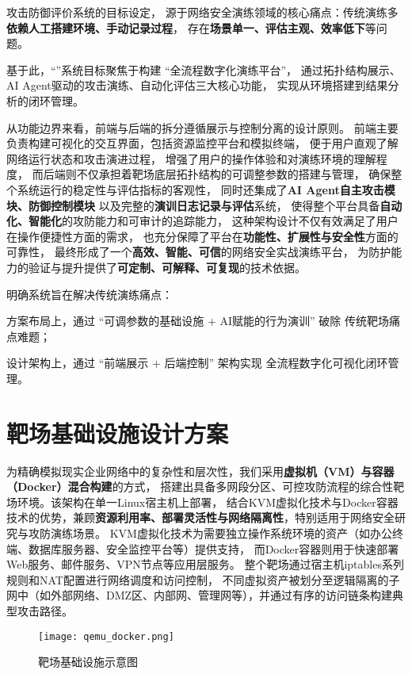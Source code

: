 \documentclass[lang=cn,10pt]{elegantbook}
\begin{document}
攻击防御评价系统的目标设定，
源于网络安全演练领域的核心痛点：传统演练多\textbf{依赖人工搭建环境、手动记录过程}，
存在\textbf{场景单一、评估主观、效率低下}等问题。

基于此，“”系统目标聚焦于构建 “全流程数字化演练平台”，
通过拓扑结构展示、AI Agent驱动的攻击演练、自动化评估三大核心功能，
实现从环境搭建到结果分析的闭环管理。

从功能边界来看，前端与后端的拆分遵循展示与控制分离的设计原则。
前端主要负责构建可视化的交互界面，包括资源监控平台和模拟终端，
便于用户直观了解网络运行状态和攻击演进过程，
增强了用户的操作体验和对演练环境的理解程度，
而后端则不仅承担着靶场底层拓扑结构的可调整参数的搭建与管理，
确保整个系统运行的稳定性与评估指标的客观性，
同时还集成了\textbf{AI Agent自主攻击模块、防御控制模块}
以及完整的\textbf{演训日志记录与评估}系统，
使得整个平台具备\textbf{自动化、智能化}的攻防能力和可审计的追踪能力，
这种架构设计不仅有效满足了用户在操作便捷性方面的需求，
也充分保障了平台在\textbf{功能性、扩展性与安全性}方面的可靠性，
最终形成了一个\textbf{高效、智能、可信}的网络安全实战演练平台，
为防护能力的验证与提升提供了\textbf{可定制、可解释、可复现}的技术依据。

\begin{definition}
    明确系统旨在解决传统演练痛点：

    方案布局上，通过 “可调参数的基础设施 + AI赋能的行为演训” 破除
    传统靶场痛点难题；

    设计架构上，通过 “前端展示 + 后端控制” 架构实现
    全流程数字化可视化闭环管理。
\end{definition}


\section{靶场基础设施设计方案}

为精确模拟现实企业网络中的复杂性和层次性，我们采用\textbf{虚拟机（VM）与容器（Docker）混合构建}的方式，
搭建出具备多网段分区、可控攻防流程的综合性靶场环境。该架构在单一Linux宿主机上部署，
结合KVM虚拟化技术与Docker容器技术的优势，兼顾\textbf{资源利用率、部署灵活性与网络隔离性}，特别适用于网络安全研究与攻防演练场景。
KVM虚拟化技术为需要独立操作系统环境的资产（如办公终端、数据库服务器、安全监控平台等）提供支持，
而Docker容器则用于快速部署Web服务、邮件服务、VPN节点等应用层服务。
整个靶场通过宿主机iptables系列规则和NAT配置进行网络调度和访问控制，
不同虚拟资产被划分至逻辑隔离的子网中（如外部网络、DMZ区、内部网、管理网等），并通过有序的访问链条构建典型攻击路径。

\begin{figure}[H]
\centering
\texttt{[image: qemu\_docker.png]}  %
\caption{靶场基础设施示意图}  %
\label{fig:qemu_docker}  %
\end{figure}
\end{document}

